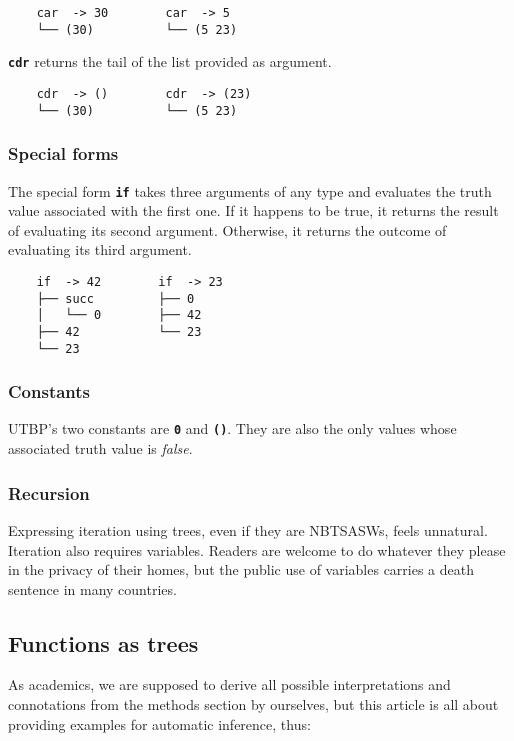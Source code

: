\documentclass[12pt,twocolumn]{article}
\begin{document}
\begin{verbatim}
    car  -> 30        car  -> 5
    └── (30)          └── (5 23)
\end{verbatim}

\texttt{\textbf{cdr}} returns the tail of the list provided as argument.

\begin{verbatim}
    cdr  -> ()        cdr  -> (23)
    └── (30)          └── (5 23)
\end{verbatim}


\subsubsection{Special forms}
The special form \texttt{\textbf{if}} takes three arguments of any type and evaluates the truth value associated with the first one. If it happens to be true, it returns the result of evaluating its second argument. Otherwise, it returns the outcome of evaluating its third argument.

\begin{verbatim}
    if  -> 42        if  -> 23
    ├── succ         ├── 0 
    │   └── 0        ├── 42 
    ├── 42           └── 23
    └── 23              
\end{verbatim}

\subsubsection{Constants}
UTBP's two constants are \texttt{\textbf{0}} and \texttt{\textbf{()}}. They are also the only values whose associated truth value is \emph{false}.

\subsubsection{Recursion}
Expressing iteration using trees, even if they are NBTSASWs, feels unnatural. Iteration also requires variables. Readers are welcome to do whatever they please in the privacy of their homes, but the public use of variables carries a death sentence in many countries.

\subsection{Functions as trees}\label{subsection_functions_as_trees}
As academics, we are supposed to derive all possible interpretations and connotations from the methods section by ourselves, but this article is all about providing examples for automatic inference, thus:
\end{document}
